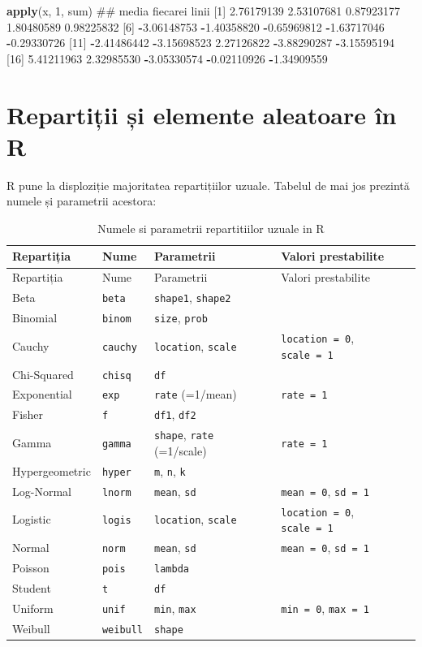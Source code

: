 \documentclass[]{article}
\newenvironment{Shaded}{\begin{snugshade}}{\end{snugshade}}
\newcommand{\KeywordTok}[1]{\textcolor[rgb]{0.13,0.29,0.53}{\textbf{#1}}}
\newcommand{\DecValTok}[1]{\textcolor[rgb]{0.00,0.00,0.81}{#1}}
\newcommand{\FloatTok}[1]{\textcolor[rgb]{0.00,0.00,0.81}{#1}}
\newcommand{\OperatorTok}[1]{\textcolor[rgb]{0.81,0.36,0.00}{\textbf{#1}}}
\newcommand{\NormalTok}[1]{#1}
\begin{document}
\begin{Shaded}
\begin{Highlighting}[]
\KeywordTok{apply}\NormalTok{(x, }\DecValTok{1}\NormalTok{, sum)   ## media fiecarei linii}
\NormalTok{ [}\DecValTok{1}\NormalTok{]  }\FloatTok{2.76179139}  \FloatTok{2.53107681}  \FloatTok{0.87923177}  \FloatTok{1.80480589}  \FloatTok{0.98225832}
\NormalTok{ [}\DecValTok{6}\NormalTok{] }\OperatorTok{-}\FloatTok{3.06148753} \OperatorTok{-}\FloatTok{1.40358820} \OperatorTok{-}\FloatTok{0.65969812} \OperatorTok{-}\FloatTok{1.63717046} \OperatorTok{-}\FloatTok{0.29330726}
\NormalTok{[}\DecValTok{11}\NormalTok{] }\OperatorTok{-}\FloatTok{2.41486442} \OperatorTok{-}\FloatTok{3.15698523}  \FloatTok{2.27126822} \OperatorTok{-}\FloatTok{3.88290287} \OperatorTok{-}\FloatTok{3.15595194}
\NormalTok{[}\DecValTok{16}\NormalTok{]  }\FloatTok{5.41211963}  \FloatTok{2.32985530} \OperatorTok{-}\FloatTok{3.05330574} \OperatorTok{-}\FloatTok{0.02110926} \OperatorTok{-}\FloatTok{1.34909559}
\end{Highlighting}
\end{Shaded}

\section{Repartiții și elemente aleatoare în
R}\label{repartitii-si-elemente-aleatoare-in-r}

R pune la disploziție majoritatea repartițiilor uzuale. Tabelul de mai
jos prezintă numele și parametrii acestora:

\begin{longtable}[]{@{}llll@{}}
\caption{Numele si parametrii repartitiilor uzuale in R}\tabularnewline
\toprule
Repartiția & Nume & Parametrii & Valori prestabilite\tabularnewline
\midrule
\endfirsthead
\toprule
Repartiția & Nume & Parametrii & Valori prestabilite\tabularnewline
\midrule
\endhead
Beta & \texttt{beta} & \texttt{shape1}, \texttt{shape2} &\tabularnewline
Binomial & \texttt{binom} & \texttt{size}, \texttt{prob}
&\tabularnewline
Cauchy & \texttt{cauchy} & \texttt{location}, \texttt{scale} &
\texttt{location\ =\ 0}, \texttt{scale\ =\ 1}\tabularnewline
Chi-Squared & \texttt{chisq} & \texttt{df} &\tabularnewline
Exponential & \texttt{exp} & \texttt{rate} (=1/mean) &
\texttt{rate\ =\ 1}\tabularnewline
Fisher & \texttt{f} & \texttt{df1}, \texttt{df2} &\tabularnewline
Gamma & \texttt{gamma} & \texttt{shape}, \texttt{rate} (=1/scale) &
\texttt{rate\ =\ 1}\tabularnewline
Hypergeometric & \texttt{hyper} & \texttt{m}, \texttt{n}, \texttt{k}
&\tabularnewline
Log-Normal & \texttt{lnorm} & \texttt{mean}, \texttt{sd} &
\texttt{mean\ =\ 0}, \texttt{sd\ =\ 1}\tabularnewline
Logistic & \texttt{logis} & \texttt{location}, \texttt{scale} &
\texttt{location\ =\ 0}, \texttt{scale\ =\ 1}\tabularnewline
Normal & \texttt{norm} & \texttt{mean}, \texttt{sd} &
\texttt{mean\ =\ 0}, \texttt{sd\ =\ 1}\tabularnewline
Poisson & \texttt{pois} & \texttt{lambda} &\tabularnewline
Student & \texttt{t} & \texttt{df} &\tabularnewline
Uniform & \texttt{unif} & \texttt{min}, \texttt{max} &
\texttt{min\ =\ 0}, \texttt{max\ =\ 1}\tabularnewline
Weibull & \texttt{weibull} & \texttt{shape} &\tabularnewline
\bottomrule
\end{longtable}
\end{document}
